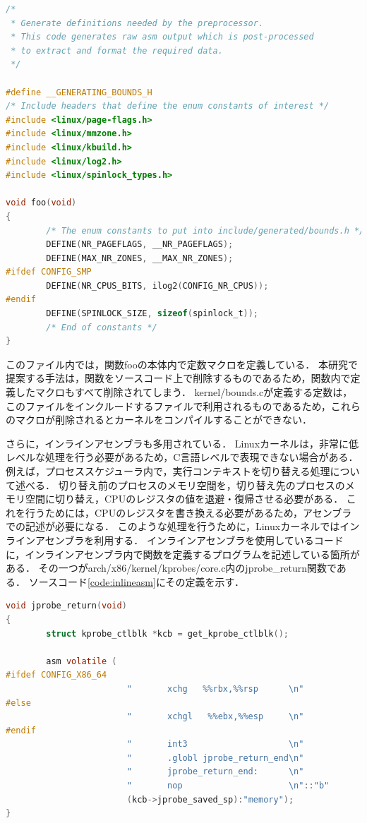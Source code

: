 \documentclass[graduation-thesis]{mlarticle}
\begin{document}
\begin{lstlisting}[language=C, caption=kernel/bounds.c, label=code:bounds]
/*
 * Generate definitions needed by the preprocessor.
 * This code generates raw asm output which is post-processed
 * to extract and format the required data.
 */

#define __GENERATING_BOUNDS_H
/* Include headers that define the enum constants of interest */
#include <linux/page-flags.h>
#include <linux/mmzone.h>
#include <linux/kbuild.h>
#include <linux/log2.h>
#include <linux/spinlock_types.h>

void foo(void)
{
        /* The enum constants to put into include/generated/bounds.h */
        DEFINE(NR_PAGEFLAGS, __NR_PAGEFLAGS);
        DEFINE(MAX_NR_ZONES, __MAX_NR_ZONES);
#ifdef CONFIG_SMP
        DEFINE(NR_CPUS_BITS, ilog2(CONFIG_NR_CPUS));
#endif
        DEFINE(SPINLOCK_SIZE, sizeof(spinlock_t));
        /* End of constants */
}
\end{lstlisting}

このファイル内では，関数fooの本体内で定数マクロを定義している．
本研究で提案する手法は，関数をソースコード上で削除するものであるため，関数内で定義したマクロもすべて削除されてしまう．
kernel/bounds.cが定義する定数は，このファイルをインクルードするファイルで利用されるものであるため，これらのマクロが削除されるとカーネルをコンパイルすることができない．

さらに，インラインアセンブラも多用されている．
Linuxカーネルは，非常に低レベルな処理を行う必要があるため，C言語レベルで表現できない場合がある．
例えば，プロセススケジューラ内で，実行コンテキストを切り替える処理について述べる．
切り替え前のプロセスのメモリ空間を，切り替え先のプロセスのメモリ空間に切り替え，CPUのレジスタの値を退避・復帰させる必要がある．
これを行うためには，CPUのレジスタを書き換える必要があるため，アセンブラでの記述が必要になる．
このような処理を行うために，Linuxカーネルではインラインアセンブラを利用する．
インラインアセンブラを使用しているコードに，インラインアセンブラ内で関数を定義するプログラムを記述している箇所がある．
その一つがarch/x86/kernel/kprobes/core.c内のjprobe\_return関数である．
ソースコード\ref{code:inlineasm}にその定義を示す．

\begin{lstlisting}[language=C, caption=jprobe\_return関数, label=code:inlineasm]
void jprobe_return(void)
{
        struct kprobe_ctlblk *kcb = get_kprobe_ctlblk();

        asm volatile (
#ifdef CONFIG_X86_64
                        "       xchg   %%rbx,%%rsp      \n"
#else
                        "       xchgl   %%ebx,%%esp     \n"
#endif
                        "       int3                    \n"
                        "       .globl jprobe_return_end\n"
                        "       jprobe_return_end:      \n"
                        "       nop                     \n"::"b"
                        (kcb->jprobe_saved_sp):"memory");
}
\end{lstlisting}
\end{document}
